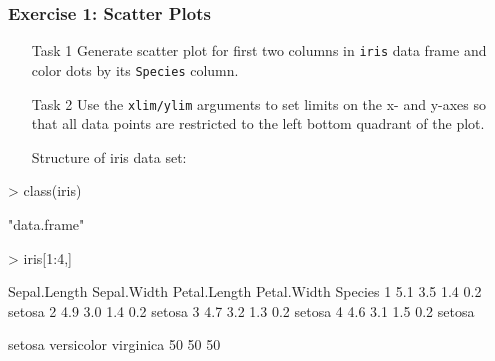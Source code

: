\documentclass{beamer}
\newcommand{\Rfunction}[1]{{\texttt{#1}}}
\newcommand{\Rfunarg}[1]{{\texttt{#1}}}
\begin{document}
\begin{frame}[containsverbatim]  
	\frametitle{Exercise 1: Scatter Plots}
\scriptsize
\begin{itemize}
        \item[Task 1] Generate scatter plot for first two columns in \Rfunction{iris} data frame and color dots by its \Rfunction{Species} column.
        \item[Task 2] Use the \Rfunarg{xlim/ylim} arguments to set limits on the x- and y-axes so that all data points are restricted to the left bottom quadrant of the plot. 
        \item[]\hspace{-1.1cm} Structure of iris data set:
\end{itemize}
\begin{Schunk}
\begin{Sinput}
> class(iris)
\end{Sinput}
\begin{Soutput}
[1] "data.frame"
\end{Soutput}
\begin{Sinput}
> iris[1:4,]
\end{Sinput}
\begin{Soutput}
  Sepal.Length Sepal.Width Petal.Length Petal.Width Species
1          5.1         3.5          1.4         0.2  setosa
2          4.9         3.0          1.4         0.2  setosa
3          4.7         3.2          1.3         0.2  setosa
4          4.6         3.1          1.5         0.2  setosa
\end{Soutput}
\begin{Soutput}
    setosa versicolor  virginica 
        50         50         50 
\end{Soutput}
\end{Schunk}
\end{frame}
\end{document}
